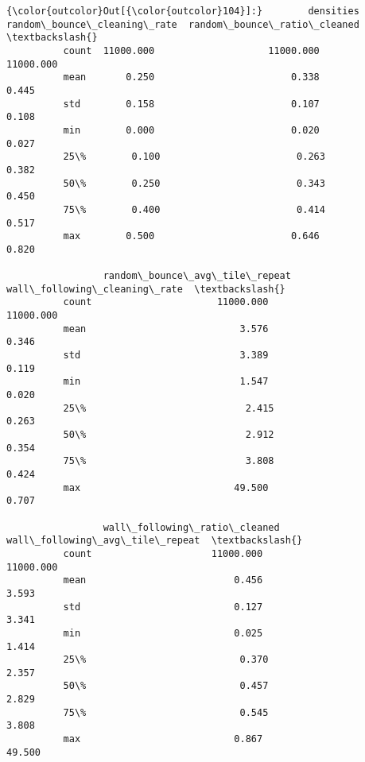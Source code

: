 \documentclass[11pt]{article}
\begin{document}
\begin{Verbatim}[commandchars=\\\{\}]
{\color{outcolor}Out[{\color{outcolor}104}]:}        densities  random\_bounce\_cleaning\_rate  random\_bounce\_ratio\_cleaned  \textbackslash{}
          count  11000.000                    11000.000                    11000.000   
          mean       0.250                        0.338                        0.445   
          std        0.158                        0.107                        0.108   
          min        0.000                        0.020                        0.027   
          25\%        0.100                        0.263                        0.382   
          50\%        0.250                        0.343                        0.450   
          75\%        0.400                        0.414                        0.517   
          max        0.500                        0.646                        0.820   
          
                 random\_bounce\_avg\_tile\_repeat  wall\_following\_cleaning\_rate  \textbackslash{}
          count                      11000.000                     11000.000   
          mean                           3.576                         0.346   
          std                            3.389                         0.119   
          min                            1.547                         0.020   
          25\%                            2.415                         0.263   
          50\%                            2.912                         0.354   
          75\%                            3.808                         0.424   
          max                           49.500                         0.707   
          
                 wall\_following\_ratio\_cleaned  wall\_following\_avg\_tile\_repeat  \textbackslash{}
          count                     11000.000                       11000.000   
          mean                          0.456                           3.593   
          std                           0.127                           3.341   
          min                           0.025                           1.414   
          25\%                           0.370                           2.357   
          50\%                           0.457                           2.829   
          75\%                           0.545                           3.808   
          max                           0.867                          49.500   
          

\end{Verbatim}
\end{document}
